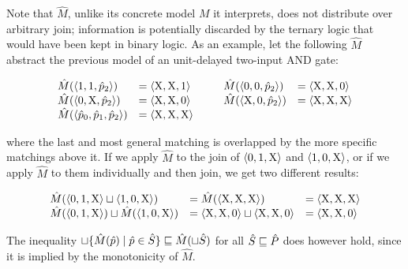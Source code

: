 
Note that $\hat M$, unlike its concrete model $M$ it interprets, does not distribute over arbitrary join; information is potentially discarded by the ternary logic that would have been kept in binary logic. As an example, let the following $\hat M$ abstract the previous model of an unit-delayed two-input AND gate:


\begin{equation*}
\begin{array}{llll}
  \hat M(\langle 1, 1, \hat p_{2} \rangle) & = \langle \mathrm{X}, \mathrm{X}, 1 \rangle \qquad & \hat M(\langle 0, 0, \hat p_{2} \rangle) & = \langle \mathrm{X}, \mathrm{X}, 0 \rangle \\
  \hat M(\langle 0, \mathrm{X}, \hat p_{2} \rangle) & = \langle \mathrm{X}, \mathrm{X}, 0 \rangle & \hat M(\langle \mathrm{X}, 0, \hat p_{2} \rangle) & = \langle \mathrm{X}, \mathrm{X}, \mathrm{X} \rangle \\
  \hat M(\langle \hat p_{0}, \hat p_{1}, \hat p_{2} \rangle) & = \langle \mathrm{X}, \mathrm{X}, \mathrm{X} \rangle & &
\end{array}
\end{equation*}


\noindent where the last and most general matching is overlapped by the more specific matchings above it. If we apply $\hat M$ to the join of $\langle 0, 1, \mathrm{X} \rangle$ and $\langle 1, 0, \mathrm{X} \rangle$, or if we apply $\hat M$ to them individually and then join, we get two different results:

\begin{equation*}
\begin{array}{lll}
  \hat M(\langle 0, 1, \mathrm{X} \rangle \sqcup \langle 1, 0, \mathrm{X} \rangle) &= \hat M(\langle \mathrm{X}, \mathrm{X}, \mathrm{X} \rangle) &= \langle \mathrm{X}, \mathrm{X}, \mathrm{X} \rangle \\
  \hat M(\langle 0, 1, \mathrm{X} \rangle) \sqcup \hat M(\langle 1, 0, \mathrm{X} \rangle) &= \langle \mathrm{X}, \mathrm{X}, 0 \rangle \sqcup \langle \mathrm{X}, \mathrm{X}, 0 \rangle &= \langle \mathrm{X}, \mathrm{X}, 0 \rangle
\end{array}
\end{equation*}

\noindent The inequality $\sqcup \{ \hat M(\hat p) \mid \hat p \in \hat S \} \sqsubseteq \hat M(\sqcup \hat S)$ for all $\hat S \sqsubseteq \hat P$ does however hold, since it is implied by the monotonicity of $\hat M$.


